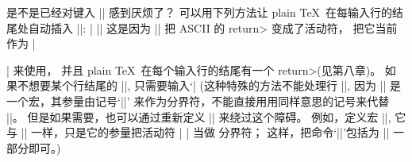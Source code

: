 {{{%
\ddanger 是不是已经对键入 |\cr| 感到厌烦了？
可以用下列方法让 plain \TeX\ 在每输入行的结尾处自动插入 |\cr|:
\begindisplay
|\begingroup \let\par=\cr \obeylines %
|\endgroup|\cr
\enddisplay
这是因为 |\obeylines| 把 ASCII 的 \<return> 变成了活动符，
把它当前作为 |\par| 来使用，
并且 plain \TeX\ 在每个输入行的结尾有一个 \<return>(见第八章)。%
如果不想要某个行结尾的 |\cr|, 只需要输入`|%
(这种特殊的方法不能处理行 |\+|, 因为 |\+| 是一个宏，其参量由记号`|\cr|'%
来作为分界符，不能直接用用同样意思的记号来代替 |\cr|。%
但是如果需要，也可以通过重新定义 |\+| 来绕过这个障碍。%
例如，定义宏 |\alternateplus|, 它与 |\+| 一样，只是它的参量把活动符 |^^M| 当做%
分界符；
这样，把命令`|\let\+=\alternateplus|'包括为 |\obeylines| 一部分即可。)

}}}
